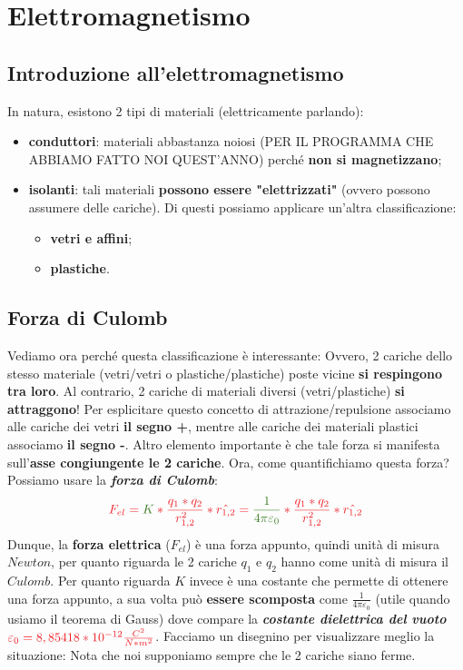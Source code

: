 \section{Elettromagnetismo}

    \subsection{Introduzione all'elettromagnetismo}
        In natura, esistono 2 tipi di materiali (elettricamente parlando):
        \begin{itemize}
            \item \textbf{conduttori}: materiali abbastanza noiosi (PER IL PROGRAMMA CHE ABBIAMO FATTO NOI QUEST'ANNO) perché \textbf{non si magnetizzano};
            \item \textbf{isolanti}: tali materiali \textbf{possono essere "elettrizzati"} (ovvero possono assumere delle cariche). Di questi possiamo applicare un'altra classificazione:
            \begin{itemize}
                \item \textbf{vetri e affini};
                \item \textbf{plastiche}.
            \end{itemize}
        \end{itemize}
    
    \subsection{Forza di Culomb}
        Vediamo ora perché questa classificazione è interessante:
        Ovvero, 2 cariche dello stesso materiale (vetri/vetri o plastiche/plastiche) poste vicine \textbf{si respingono tra loro}. Al contrario, 2 cariche di materiali diversi (vetri/plastiche) \textbf{si attraggono}! Per esplicitare questo concetto di attrazione/repulsione associamo alle cariche dei vetri \textbf{il segno +}, mentre alle cariche dei materiali plastici associamo \textbf{il segno -}. Altro elemento importante è che tale forza si manifesta sull'\textbf{asse congiungente le 2 cariche}. Ora, come quantifichiamo questa forza? Possiamo usare la \textbf{\textit{forza di Culomb}}:
        \begin{align*}
            \textcolor{Red}{F_{el}=\textcolor{OliveGreen}{K}*\frac{q_1*q_2}{r^2_{1,2}}*\hat{r_{1,2}}=\textcolor{OliveGreen}{\frac{1}{4\pi\varepsilon_0}}*\frac{q_1*q_2}{r^2_{1,2}}*\hat{r_{1,2}}}
        \end{align*}
        Dunque, la \textbf{forza elettrica} ($F_{el}$) è una forza appunto, quindi unità di misura $Newton$, per quanto riguarda le 2 cariche $q_1$ e $q_2$ hanno come unità di misura il $Culomb$. Per quanto riguarda $K$ invece è una costante che permette di ottenere una forza appunto, a sua volta può \textbf{essere scomposta} come $\frac{1}{4\pi\varepsilon_0}$ (utile quando usiamo il teorema di Gauss) dove compare la \textbf{\textit{costante dielettrica del vuoto}} $\textcolor{Red}{\varepsilon_0 = 8,85418*10^{-12}\frac{C^2}{N*m^2}}$. Facciamo un disegnino per visualizzare meglio la situazione:
        Nota che noi supponiamo sempre che le 2 cariche siano ferme.

